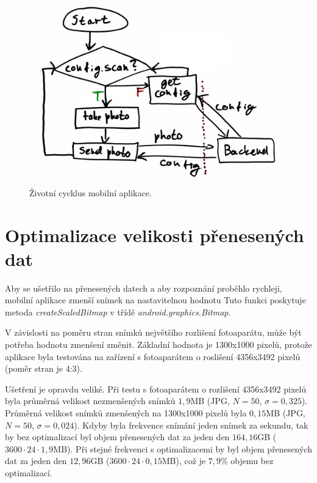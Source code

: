 \begin{figure}[!htb] \centering
  \includegraphics[width=135mm]{../img/app_lifecycle.jpg}
  \caption{Životní cycklus mobilní aplikace.}
  \label{fig:app_lifecycle}
\end{figure}

\section{Optimalizace velikosti přenesených dat} \label{app_resizing}

\noindent
Aby se ušetřilo na přenesených datech a aby rozpoznání proběhlo rychleji,
mobilní aplikace zmenší snímek
na nastavitelnou hodnotu
Tuto funkci poskytuje metoda \textit{createScaledBitmap} v třídě \textit{android.graphics.Bitmap}.

V závislosti na poměru stran snímků největšího rozlišení fotoaparátu,
může být potřeba hodnotu zmenšení změnit.
Základní hodnota je 1300x1000 pixelů, protože aplikace byla testována na
zařízení s fotoaparátem o roslišení 4356x3492 pixelů (poměr stran je 4:3).

Ušetření je opravdu veliké. Při testu s fotoaparátem o rozlišení 4356x3492 pixelů
byla průměrná velikost nezmenšených snímků $1,9$MB (JPG, $N=50$, $\sigma=0,325$).
Průměrná velikost snímků zmenšených na 1300x1000 pixelů byla
$0,15$MB (JPG, $N=50$, $\sigma=0,024$). Kdyby byla frekvence snímání jeden snímek za sekundu,
tak by bez optimalizací byl objem přenesených dat za jeden den $164,16$GB ($3600\cdot24\cdot1,9$MB).
Při stejné frekvenci s optimalizacemi by byl objem přenesených dat za jeden den
$12,96$GB ($3600\cdot24\cdot0,15$MB), což je $7,9$\% objemu bez optimalizací.

